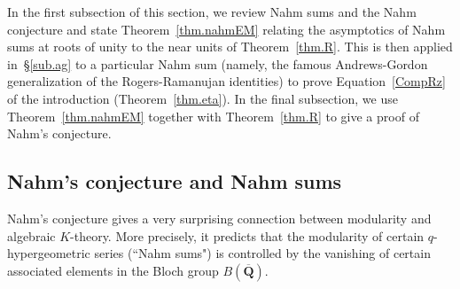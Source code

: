 \documentclass[12pt,reqno]{amsart}
\theoremstyle{definition}
\newcommand{\changed}[1]{{#1}}
\def\Q{\mathbf Q}   %
\def\Qbar{\overline{\Q}}
\begin{document}
In the first subsection of this section, we review Nahm sums and the Nahm 
conjecture and state Theorem~\ref{thm.nahmEM} relating the asymptotics of 
Nahm sums at roots of unity to the near units of Theorem~\ref{thm.R}. This 
is then applied in~\S\ref{sub.ag} to a particular Nahm sum (namely, the 
famous Andrews-Gordon generalization of the Rogers-Ramanujan identities) to 
prove Equation~\eqref{CompRz} of the introduction (Theorem~\ref{thm.eta}).
In the final subsection, we use Theorem~\ref{thm.nahmEM} together with 
Theorem~\ref{thm.R} to give a proof of Nahm's conjecture.
 
\subsection{Nahm's conjecture and Nahm sums}
\label{sub.nahm}

Nahm's conjecture gives a very surprising connection between modularity and
algebraic $K$-theory.  More precisely, it predicts that the modularity of
certain $q$-hypergeometric series (``Nahm sums") is controlled by the vanishing 
of certain associated elements in the Bloch group \changed{$B(\Qbar)$.}
\end{document}
